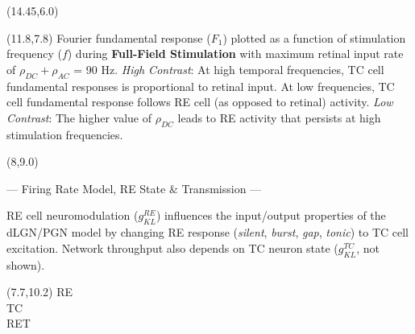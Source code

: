 \documentclass[a0]{a0poster}
\def\CHead#1{\begin{center} {\LARGE\color{DarkBlue} #1} \end{center}}
\begin{document}
\begin{textblock}{2.65}(14.45,6.0)
\begin{center}
\end{center}
\end{textblock}

\begin{textblock}{5.3}(11.8,7.8)
Fourier fundamental response ($F_1$) plotted as a function of stimulation
frequency ($f$) during {\bf Full-Field Stimulation} with 
maximum retinal input rate of $\rho_{DC}+\rho_{AC}$ = 90 Hz.  {\it
High Contrast}: At high temporal frequencies, TC cell fundamental responses
is proportional to retinal input. At low frequencies, TC cell fundamental
response follows RE cell (as opposed to retinal) activity. 
{\it Low Contrast}: 
The higher value of $\rho_{DC}$ leads to RE activity  
that persists at high stimulation frequencies. 

\end{textblock}

\begin{textblock}{9.1}(8,9.0)
\CHead{--- Firing Rate Model, RE State \& Transmission --- } 
RE cell neuromodulation ($g_{KL}^{RE}$) 
influences the input/output properties of the
dLGN/PGN model by changing RE response 
({\it silent}, {\it burst}, 
{\it gap}, {\it tonic}) 
to TC cell excitation. Network throughput also
depends on TC neuron state ($g_{KL}^{TC}$, not shown). 
\end{textblock}

\begin{textblock}{0.2}(7.7,10.2)
RE\\[1in] TC\\[1in] RET
\end{textblock}
\end{document}
